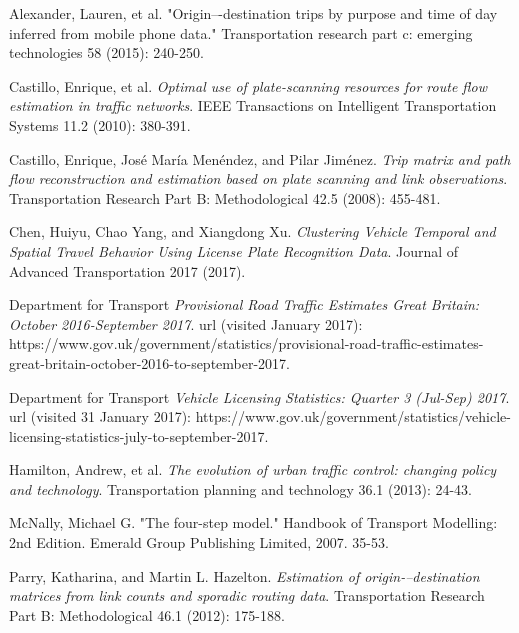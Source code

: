 \documentclass[twoside,leqno,twocolumn]{article}
\begin{document}










\begin{thebibliography}{99}

Alexander, Lauren, et al. "Origin–-destination trips by purpose and time of day inferred from mobile phone data." Transportation research part c: emerging technologies 58 (2015): 240-250.

Castillo, Enrique, et al. {\em Optimal use of plate-scanning resources for route flow estimation in traffic networks}. IEEE Transactions on Intelligent Transportation Systems 11.2 (2010): 380-391.

Castillo, Enrique, José María Menéndez, and Pilar Jiménez. {\em Trip matrix and path flow reconstruction and estimation based on plate scanning and link observations}. Transportation Research Part B: Methodological 42.5 (2008): 455-481.

Chen, Huiyu, Chao Yang, and Xiangdong Xu. {\em Clustering Vehicle Temporal and Spatial Travel Behavior Using License Plate Recognition Data}. Journal of Advanced Transportation 2017 (2017).

Department for Transport {\em Provisional Road Traffic Estimates Great Britain: October 2016-September 2017}. url (visited January 2017): https://www.gov.uk\-/government/statistics/provisional-road-traffic-estima\-tes-great-britain-october-2016-to-september-2017.


Department for Transport {\em Vehicle Licensing Statistics: Quarter 3 (Jul-Sep) 2017}. url (visited 31 January 2017): https://www.gov.uk/government/statistics\-/vehicle-licensing-statistics-july-to-september-2017.

Hamilton, Andrew, et al. {\em The evolution of urban traffic control: changing policy and technology}. Transportation planning and technology 36.1 (2013): 24-43.

McNally, Michael G. "The four-step model." Handbook of Transport Modelling: 2nd Edition. Emerald Group Publishing Limited, 2007. 35-53.

Parry, Katharina, and Martin L. Hazelton. {\em Estimation of origin-–destination matrices from link counts and sporadic routing data}. Transportation Research Part B: Methodological 46.1 (2012): 175-188.


\end{thebibliography}
\end{document}
